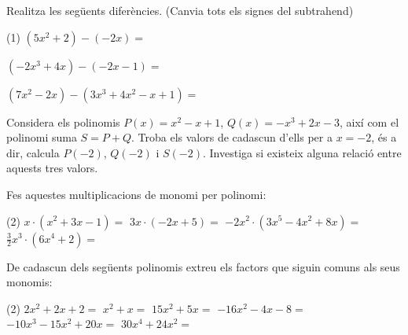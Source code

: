 \begin{mylist}
\answers{[$-5x^3+9x-1$, $-6x^3+3x^2-x+9$]}


\exer  \spen Realitza les següents diferències. (Canvia tots els signes del subtrahend) 
\begin{tasks}(1)
\task   $(5x^{2} +2)-(-2x)=$

\task   $(-2x^{3} +4x)-(-2x-1)=$            

\task  $ (7x^{2} -2x)-(3x^{3} +4x^{2} -x+1)=$
\end{tasks}

\answers{[$5x^2+2x+2$, $-2x^3+6x+1$, $-3x^3+3x^2-x-1$]}

\exer  Considera els polinomis $P(x)= x^{2} -x+1$, $Q(x)= -x^{3} +2x-3$, així com el polinomi suma $S=P+Q$. Troba els valors de cadascun d'ells per a $x=-2$, és a dir, calcula $P(-2)$, $Q(-2)$ i $S(-2)$. Investiga si existeix alguna relació entre aquests tres valors.   


\exer  Fes aquestes multiplicacions de monomi per polinomi:
\begin{tasks}(2)
	\task $x\cdot (x^2+3x-1)=$
	\task $3x\cdot (-2x+5)=$
	\task $-2x^2\cdot (3x^5 - 4x^2 + 8x)=$
	\task $\frac{3}{2}x^3\cdot (6x^4 + 2)=$
\end{tasks}  

\answers{[$x^3+3x^2-x$, $-6x^2+15x$, $-6x^7+8x^4-16x^3$, $9x^7+3x^3$]}

\exer \spen De cadascun dels següents polinomis extreu els factors que siguin comuns als seus monomis:

\begin{tasks}(2)
	\task  $2x^2+2x+2=$ 
	\task  $x^2+x=$  
	\task  $15x^2+5x=$
	\task  $-16x^2-4x-8=$   
	\task  $-10x^{3} -15x^{2} +20x=$   	
	\task  $30x^{4} +24x^{2}=$
\end{tasks}


\end{mylist}
